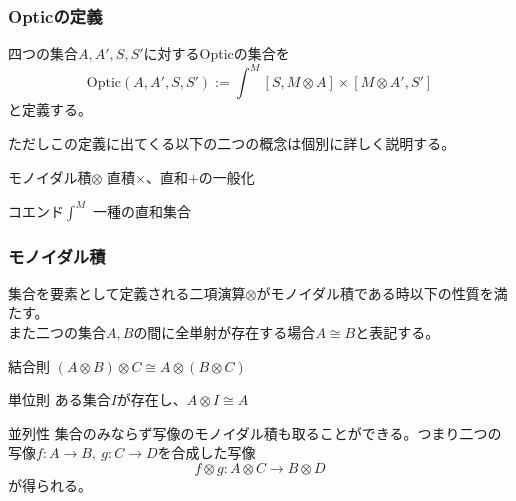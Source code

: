 \documentclass[uplatex,dvipdfmx]{beamer}
\newcommand{\arrow}{\rightarrow}
\newcommand{\mor}[3]{#1:#2\arrow #3}
\newcommand{\inset}[2]{[#1,#2]}
\newenvironment{mydescription}
{\begin{description}
  \setlength{\parskip}{0.5cm}
}
{\end{description}}
\begin{document}
  \begin{frame}\frametitle{Opticの定義}
    \begin{definition}[Optic]
      四つの集合$A,A',S,S'$に対するOpticの集合を\[\mathrm{Optic}(A,A',S,S') := \int^M \inset{S}{M\otimes A}\times \inset{M\otimes A'}{S'}\]と定義する。
    \end{definition}
    ただしこの定義に出てくる以下の二つの概念は個別に詳しく説明する。\\
    \vspace{\baselineskip}

    \begin{mydescription}
      \item[モノイダル積$\otimes$] 直積$\times$、直和$+$の一般化
      \item[コエンド$\int^M$] 一種の直和集合
    \end{mydescription}
  \end{frame}
  \begin{frame}\frametitle{モノイダル積}
    集合を要素として定義される二項演算$\otimes$がモノイダル積である時以下の性質を満たす。\\
    \vspace{\baselineskip}
    また二つの集合$A,B$の間に全単射が存在する場合$A\cong B$と表記する。
    \begin{mydescription}
      \item[結合則] $(A\otimes B)\otimes C\cong A\otimes(B\otimes C)$
      \item[単位則] ある集合$I$が存在し、$A\otimes I\cong A$\\
      \item[並列性] 集合のみならず写像のモノイダル積も取ることができる。つまり二つの写像$\mor{f}{A}{B},\ \mor{g}{C}{D}$を合成した写像
      \[\mor{f\otimes g}{A\otimes C}{B\otimes D}\]が得られる。
    \end{mydescription}
  \end{frame}
\end{document}
